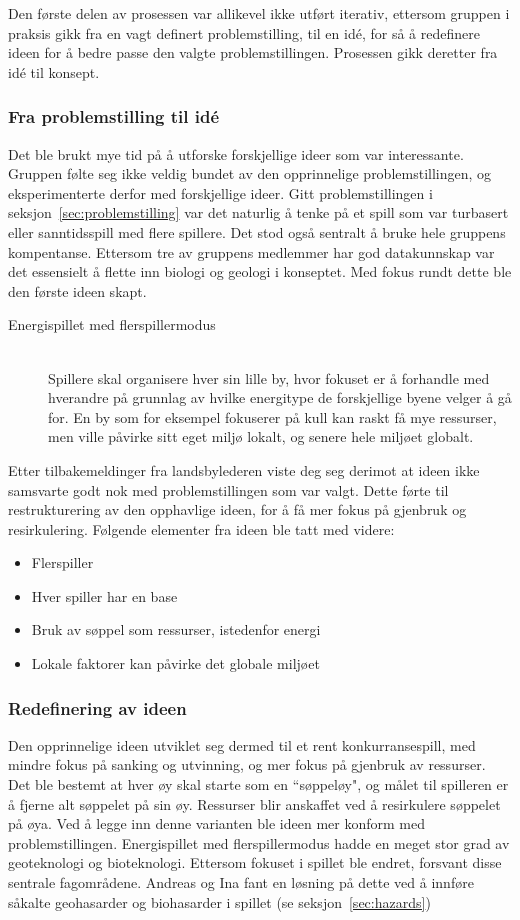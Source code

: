 Den første delen av prosessen var allikevel ikke utført iterativ, ettersom gruppen i praksis gikk fra en vagt definert problemstilling, til en idé, for så å redefinere ideen for å bedre passe den valgte problemstillingen. Prosessen gikk deretter fra idé til konsept.
\subsubsection{Fra problemstilling til idé}
Det ble brukt mye tid på å utforske forskjellige ideer som var
interessante. Gruppen følte seg ikke veldig bundet av den opprinnelige
problemstillingen, og eksperimenterte derfor med forskjellige ideer.
Gitt problemstillingen i seksjon~\ref{sec:problemstilling} var det
naturlig å tenke på et spill som var turbasert eller sanntidsspill med
flere spillere. Det stod også sentralt å bruke hele gruppens kompentanse. Ettersom tre av gruppens medlemmer har god datakunnskap var det essensielt å flette inn biologi og geologi i konseptet. Med fokus rundt dette ble den første ideen skapt.
\begin{description}
\item[Energispillet med flerspillermodus] \hfill\\
Spillere skal organisere hver sin lille by, hvor fokuset er å forhandle
med hverandre på grunnlag av hvilke energitype de forskjellige byene
velger å gå for. En by som for eksempel fokuserer på kull kan raskt få
mye ressurser, men ville påvirke sitt eget miljø lokalt, og senere hele
miljøet globalt.
\end{description}
Etter tilbakemeldinger fra landsbylederen viste deg seg derimot at ideen
ikke samsvarte godt nok med problemstillingen som var valgt. Dette førte
til restrukturering av den opphavlige ideen, for å få mer fokus på
gjenbruk og resirkulering. Følgende elementer fra ideen ble tatt med
videre:
\begin{itemize}
	\item Flerspiller
	\item Hver spiller har en base
	\item Bruk av søppel som ressurser, istedenfor energi
	\item Lokale faktorer kan påvirke det globale miljøet
\end{itemize}
\subsubsection{Redefinering av ideen}
Den opprinnelige ideen utviklet seg dermed til et rent konkurransespill,
med mindre fokus på sanking og utvinning, og mer fokus på gjenbruk av ressurser. 
Det ble bestemt at hver øy skal starte som en ``søppeløy", og målet til
spilleren er å fjerne alt søppelet på sin øy.  Ressurser blir anskaffet
ved å resirkulere søppelet på øya. Ved å legge inn denne varianten ble
ideen mer konform med problemstillingen. Energispillet med
flerspillermodus hadde en meget stor grad av geoteknologi og
bioteknologi. Ettersom fokuset i spillet ble endret,
forsvant disse sentrale fagområdene. Andreas og Ina fant en løsning
på dette ved å innføre såkalte geohasarder og biohasarder i spillet (se
seksjon~\ref{sec:hazards})



